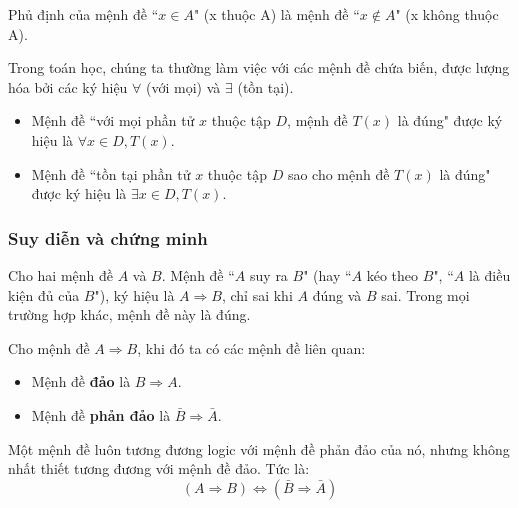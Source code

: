 \begin{example}
    Phủ định của mệnh đề ``$x \in A$" (x thuộc A) là mệnh đề ``$x \notin A$" (x không thuộc A).
\end{example}

Trong toán học, chúng ta thường làm việc với các mệnh đề chứa biến, được lượng hóa bởi các ký hiệu $\forall$ (với mọi) và $\exists$ (tồn tại).
\begin{itemize}
    \item Mệnh đề ``với mọi phần tử $x$ thuộc tập $D$, mệnh đề $T(x)$ là đúng" được ký hiệu là $\forall x \in D, T(x)$.
    \item Mệnh đề ``tồn tại phần tử $x$ thuộc tập $D$ sao cho mệnh đề $T(x)$ là đúng" được ký hiệu là $\exists x \in D, T(x)$.
\end{itemize}

\subsubsection{Suy diễn và chứng minh}

\begin{definition}
    Cho hai mệnh đề $A$ và $B$. Mệnh đề ``$A$ suy ra $B$" (hay ``$A$ kéo theo $B$", ``$A$ là điều kiện đủ của $B$"), ký hiệu là $A \Rightarrow B$, chỉ sai khi $A$ đúng và $B$ sai. Trong mọi trường hợp khác, mệnh đề này là đúng.
\end{definition}

\begin{definition}
    Cho mệnh đề $A \Rightarrow B$, khi đó ta có các mệnh đề liên quan:

    \begin{itemize}
        \item Mệnh đề \textbf{đảo} là $B \Rightarrow A$.
        \item Mệnh đề \textbf{phản đảo} là $\bar{B} \Rightarrow \bar{A}$.
    \end{itemize}
    
    Một mệnh đề luôn tương đương logic với mệnh đề phản đảo của nó, nhưng không nhất thiết tương đương với mệnh đề đảo. Tức là: 
    \[(A \Rightarrow B) \iff (\bar{B} \Rightarrow \bar{A})\]
\end{definition}

